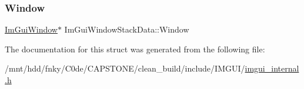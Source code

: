 \mbox{\label{structImGuiWindowStackData_afb70ab508cff8113d27a528a7aad4679}} 
\subsubsection{\texorpdfstring{Window}{Window}}
{\footnotesize\ttfamily \hyperlink{structImGuiWindow}{Im\+Gui\+Window}$\ast$ Im\+Gui\+Window\+Stack\+Data\+::\+Window}



The documentation for this struct was generated from the following file\+:\begin{DoxyCompactItemize}
\item 
/mnt/hdd/fnky/\+C0de/\+C\+A\+P\+S\+T\+O\+N\+E/clean\+\_\+build/include/\+I\+M\+G\+U\+I/\hyperlink{imgui__internal_8h}{imgui\+\_\+internal.\+h}\end{DoxyCompactItemize}
